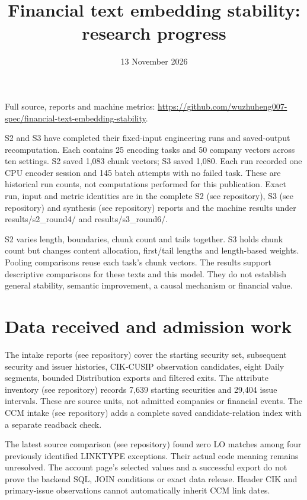 \documentclass[11pt]{article}
\title{Financial text embedding stability: research progress}
\author{}
\date{13 November 2026}
\begin{document}
\maketitle
\noindent Full source, reports and machine metrics: \url{https://github.com/wuzhuheng007-spec/financial-text-embedding-stability}.

S2 and S3 have completed their fixed-input engineering runs and saved-output recomputation. Each contains 25 encoding tasks and 50 company vectors across ten settings. S2 saved 1,083 chunk vectors; S3 saved 1,080. Each run recorded one CPU encoder session and 145 batch attempts with no failed task. These are historical run counts, not computations performed for this publication. Exact run, input and metric identities are in the complete S2 (see repository), S3 (see repository) and synthesis (see repository) reports and the machine results under results/s2\_round4/ and results/s3\_round6/.

S2 varies length, boundaries, chunk count and tails together. S3 holds chunk count but changes content allocation, first/tail lengths and length-based weights. Pooling comparisons reuse each task's chunk vectors. The results support descriptive comparisons for these texts and this model. They do not establish general stability, semantic improvement, a causal mechanism or financial value.

\section*{Data received and admission work}

The intake reports (see repository) cover the starting security set, subsequent security and issuer histories, CIK-CUSIP observation candidates, eight Daily segments, bounded Distribution exports and filtered exits. The attribute inventory (see repository) records 7,639 starting securities and 29,404 issue intervals. These are source units, not admitted companies or financial events. The CCM intake (see repository) adds a complete saved candidate-relation index with a separate readback check.

The latest source comparison (see repository) found zero LO matches among four previously identified LINKTYPE exceptions. Their actual code meaning remains unresolved. The account page's selected values and a successful export do not prove the backend SQL, JOIN conditions or exact data release. Header CIK and primary-issue observations cannot automatically inherit CCM link dates.
\end{document}
